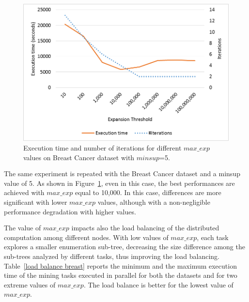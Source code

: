\begin{figure}[!t]
\includegraphics[width=5in]{immagini_extension/breast_fixed.png}
\caption{Execution time and number of iterations for different $max\_exp$ values on Breast Cancer dataset with $minsup$=5.
}
\label{breast_fixed}
\end{figure}

The same experiment is repeated with the Breast Cancer dataset and a minsup value of 5. As shown in Figure~\ref{breast_fixed}, even in this case, the best performances are achieved with $max\_exp$ equal to 10,000. In this case, differences are more significant with lower $max\_exp$ values, although with a non-negligible performance degradation with higher values. 

The value of $max\_exp$ impacts also the load balancing 
of the distributed computation among different nodes.
With low values of $max\_exp$, each task explores a
smaller enumeration sub-tree, decreasing the size difference
among the sub-trees analyzed by different tasks,
thus improving the load balancing.
Table~\ref{load balance breast} reports the minimum and the maximum execution time of
the mining tasks executed in parallel for both the datasets and for two extreme values of $max\_exp$. 
The load balance is better for the lowest value of $max\_exp$.



